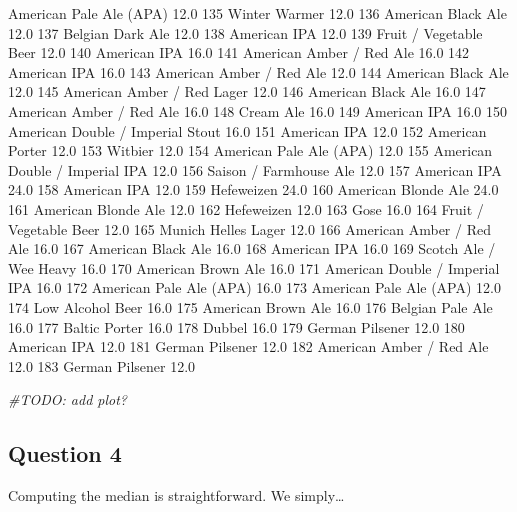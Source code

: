 \documentclass[]{article}
\newenvironment{Shaded}{\begin{snugshade}}{\end{snugshade}}
\newcommand{\CommentTok}[1]{\textcolor[rgb]{0.56,0.35,0.01}{\textit{#1}}}
\begin{document}
American Pale Ale (APA) 12.0 135 Winter Warmer 12.0 136 American Black
Ale 12.0 137 Belgian Dark Ale 12.0 138 American IPA 12.0 139 Fruit /
Vegetable Beer 12.0 140 American IPA 16.0 141 American Amber / Red Ale
16.0 142 American IPA 16.0 143 American Amber / Red Ale 12.0 144
American Black Ale 12.0 145 American Amber / Red Lager 12.0 146 American
Black Ale 16.0 147 American Amber / Red Ale 16.0 148 Cream Ale 16.0 149
American IPA 16.0 150 American Double / Imperial Stout 16.0 151 American
IPA 12.0 152 American Porter 12.0 153 Witbier 12.0 154 American Pale Ale
(APA) 12.0 155 American Double / Imperial IPA 12.0 156 Saison /
Farmhouse Ale 12.0 157 American IPA 24.0 158 American IPA 12.0 159
Hefeweizen 24.0 160 American Blonde Ale 24.0 161 American Blonde Ale
12.0 162 Hefeweizen 12.0 163 Gose 16.0 164 Fruit / Vegetable Beer 12.0
165 Munich Helles Lager 12.0 166 American Amber / Red Ale 16.0 167
American Black Ale 16.0 168 American IPA 16.0 169 Scotch Ale / Wee Heavy
16.0 170 American Brown Ale 16.0 171 American Double / Imperial IPA 16.0
172 American Pale Ale (APA) 16.0 173 American Pale Ale (APA) 12.0 174
Low Alcohol Beer 16.0 175 American Brown Ale 16.0 176 Belgian Pale Ale
16.0 177 Baltic Porter 16.0 178 Dubbel 16.0 179 German Pilsener 12.0 180
American IPA 12.0 181 German Pilsener 12.0 182 American Amber / Red Ale
12.0 183 German Pilsener 12.0

\begin{Shaded}
\begin{Highlighting}[]
\CommentTok{#TODO: add plot?}
\end{Highlighting}
\end{Shaded}

\subsection{Question 4}\label{question-4}

Computing the median is straightforward. We simply\ldots{}
\end{document}
